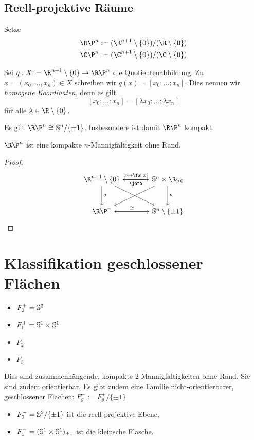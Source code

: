 \subsection{Reell-projektive Räume}

Setze
\begin{align*}
	\R\P^n &:= (\R^{n+1} \setminus \{0\}) / (\R \setminus \{0\}) \\
	\C\P^n &:= (\C^{n+1} \setminus \{0\}) / (\C \setminus \{0\})
\end{align*}

Sei $q: X := \R^{n+1} \setminus \{0\} \to \R\P^n$ die Quotientenabbildung.
Zu $x = (x_0, \dotsc, x_n) \in X$ schreiben wir $q(x) = [x_0 : \dotsc : x_n]$.
Dies nennen wir \emph{homogene Koordinaten}, denn es gilt
\[
	[x_0 : \dotsc : x_n ] = [\lambda x_0 : \dotsc : \lambda x_n]
\]
für alle $\lambda \in \R \setminus \{0\}$.

\begin{nt}
	Es gilt $\R\P^n \homeomorphic \S^n / \{\pm 1\}$.
	Insbesondere ist damit $\R\P^n$ kompakt.

	$\R\P^n$ ist eine kompakte $n$-Mannigfaltigkeit ohne Rand.
	\begin{proof}
		\[
			\begin{tikzcd}[column sep=large,row sep=large]
				\R^{n+1} \setminus \{0\} \arrow{r}{x\mapsto \f x{|x|}} \arrow{d}{q} \arrow{dr}{} &
				\S^n \times \R_{>0} \arrow{l}{\jota} \arrow{dl} \arrow{d}{p} \\
				\R\P^n \arrow{r}{\homeomorphic} &
				\S^n \setminus \{\pm 1\} \arrow{l}
			\end{tikzcd}
		\]
	\end{proof}
\end{nt}


\section{Klassifikation geschlossener Flächen}


\begin{ex}
	\begin{itemize}
		\item
			$F_0^+ = \S^2$
		\item
			$F_1^+ = \S^1 \times \S^1$
		\item
			$F_2^+$
		\item
			$F_3^+$
	\end{itemize}
	Dies sind zusammenhängende, kompakte $2$-Mannigfaltigkeiten ohne Rand.
	Sie sind zudem orientierbar.
	Es gibt zudem eine Familie nicht-orientierbarer, geschlossener Flächen: $F_g^- := F_g^+ / \{\pm 1\}$
	\begin{itemize}
		\item
			$F_0^- = \S^2 / \{\pm 1\}$ ist die reell-projektive Ebene,
		\item
			$F_1^- = (\S^1 \times \S^1)_{\pm 1}$ ist die kleinsche Flasche.
	\end{itemize}
\end{ex}



